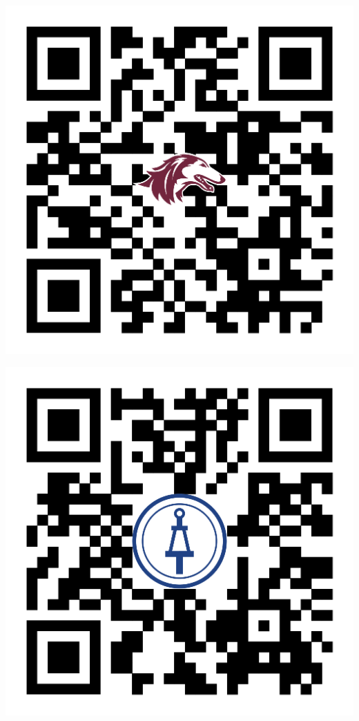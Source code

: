 \documentclass[12pt]{extarticle}
\begin{document}
\begin{minipage}{0.45\textwidth}
    \centering 
        \includegraphics[scale=0.1]{presence-qr-code.png}
\end{minipage}
\hfill 
\begin{minipage}{0.45\textwidth}
    \centering 
        \includegraphics[scale=0.1]{tbp-qr-code.png}
\end{minipage}
\end{document}
